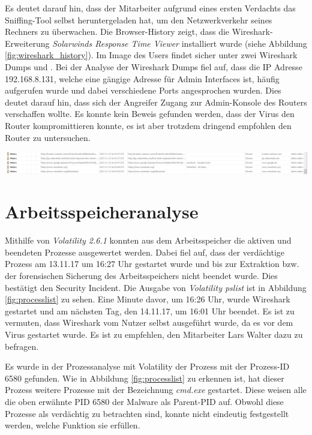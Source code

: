 Es deutet darauf hin, dass der Mitarbeiter aufgrund eines ersten Verdachts das Sniffing-Tool selbst heruntergeladen hat, um den Netzwerkverkehr seines Rechners zu überwachen.
Die Browser-History zeigt, dass die Wireshark-Erweiterung \textit{Solarwinds Response Time Viewer} installiert wurde (siehe Abbildung \ref{fig:wireshark_history}).
Im Image des Users findet sicher unter  zwei Wireshark Dumps  und .
Bei der Analyse der Wireshark Dumps fiel auf, dass die IP Adresse 192.168.8.131, welche eine gängige Adresse für Admin Interfaces ist, häufig aufgerufen wurde und dabei verschiedene Ports angesprochen wurden.
Dies deutet darauf hin, dass sich der Angreifer Zugang zur Admin-Konsole des Routers verschaffen wollte.
Es konnte kein Beweis gefunden werden, dass der Virus den Router kompromittieren konnte, es ist aber trotzdem dringend empfohlen den Router zu untersuchen.

\begin{center}
	\includegraphics[width=15.8cm]{figures/wireshark_history.PNG}
	\label{fig:wireshark_history}
\end{center}

\section{Arbeitsspeicheranalyse}
Mithilfe von \textit{Volatility 2.6.1} konnten aus dem Arbeitsspeicher die aktiven und beendeten Prozesse ausgewertet werden.
Dabei fiel auf, dass der verdächtige Prozess  am 13.11.17 um 16:27 Uhr gestartet wurde und bis zur Extraktion bzw. der forensischen Sicherung des Arbeitsspeichers nicht beendet wurde.
Dies bestätigt den Security Incident. Die Ausgabe von \textit{Volatility pslist} ist in Abbildung \ref{fig:processlist} zu sehen.
Eine Minute davor, um 16:26 Uhr, wurde Wireshark gestartet und am nächsten Tag, den 14.11.17, um 16:01 Uhr beendet.
Es ist zu vermuten, dass Wireshark vom Nutzer selbst ausgeführt wurde, da es vor dem Virus gestartet wurde.
Es ist zu empfehlen, den Mitarbeiter Lars Walter dazu zu befragen.

Es wurde in der Prozessanalyse mit Volatility der Prozess  mit der Prozess-ID 6580 gefunden.
Wie in Abbildung \ref{fig:processlist} zu erkennen ist, hat dieser Prozess weitere Prozesse mit der Bezeichnung \textit{cmd.exe} gestartet.
Diese weisen alle die oben erwähnte PID 6580 der Malware als Parent-PID auf.
Obwohl diese Prozesse als verdächtig zu betrachten sind, konnte nicht eindeutig festgestellt werden, welche Funktion sie erfüllen.

